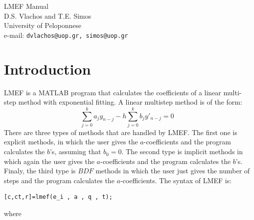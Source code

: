\documentclass[acmtoms,acmnow]{acmtrans2m}
\begin{document}
\begin{center}
{\Huge LMEF Manual}\\[5mm]
{\Large D.S. Vlachos  and T.E. Simos}\\[5mm]
{\Large University of Peloponnese}\\[5mm]
e-mail: \texttt{dvlachos@uop.gr, simos@uop.gr}
\end{center}

\vspace{1cm} %



\begin{abstract}
LMEF is a program written in MATLAB, to calculate the coefficients of a linear multi-step method (explicit, implicit or backward differentiation formulas) with algebraic and/or exponential fitting for the numerical solution of first order ordinary differential equations. Moreover, LMEF calculates the local truncation error and in the case of exponential fitting, the Taylor expansions of the coefficients which are necessary for the implementation of the method.
\end{abstract}



\section{Introduction}
LMEF is a MATLAB program that calculates the coefficients of a linear multi-step method with exponential fitting. A linear multistep method is of the form:
\begin{equation}
\sum_{j=0}^{k}a_j y_{n-j} -h\sum_{j=0}^{k}b_jy'_{n-j}=0
\end{equation}
There are three types of methods that are handled by LMEF. The first one is explicit methods, in which the user gives the $a$-coefficients and the program calculates the $b$'s, assuming that $b_0=0$. The second type is implicit methods in which again the user gives the $a$-coefficients and the program calculates the $b$'s. Finaly, the third type is $BDF$ methods in which the user just gives the number of steps and the program calculates the $a$-coefficients. 
The syntax of LMEF is:
\begin{verbatim}
[c,ct,r]=lmef(e_i , a , q , t);
\end{verbatim}
where
\end{document}
